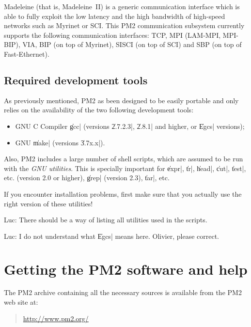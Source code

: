 Madeleine (that is, Madeleine~II) is a generic communication interface
which is able to fully exploit the low latency and the high bandwidth
of high-speed networks such as Myrinet or SCI. This PM2 communication
subsystem currently supports the following communication interfaces:
TCP, MPI (LAM-MPI, MPI-BIP), VIA, BIP (on top of Myrinet), SISCI (on
top of SCI) and SBP (on top of Fast-Ethernet).

\subsection{Required development tools}
\label{sec:tools}

As previously mentioned, PM2 as been designed to be easily portable
and only relies on the availability of the two following development
tools:
\begin{itemize}
  \small
\item GNU C Compiler \|gcc| (versions \|2.7.2.3|, \|2.8.1| and higher,
  or \|Egcs| versions);
\item GNU \|make| (versions \|3.7x.x|).
\end{itemize}
Also, PM2 includes a large number of shell scripts, which are assumed
to be run with the \emph{GNU utilities}. This is specially important
for \|expr|, \|tr|, \|head|, \|cut|, \|test|, etc. (version 2.0 or
higher), \|grep| (version 2.3), \|tar|, etc. 

\begin{warning}
  If you encounter installation problems, first make sure that you
  actually use the right version of these utilities!
\end{warning}
 
\begin{note}
  Luc: There should be a way of listing all utilities used in the
  scripts.
\end{note}

\begin{note}
  Luc: I do not understand what \|Egcs| means here. Olivier, please
  correct.
\end{note}

\section{Getting the PM2 software and help}

The PM2 archive containing all the necessary sources is available
from the PM2 web site at:
\begin{quote}
  \url{http://www.pm2.org/}
\end{quote}

